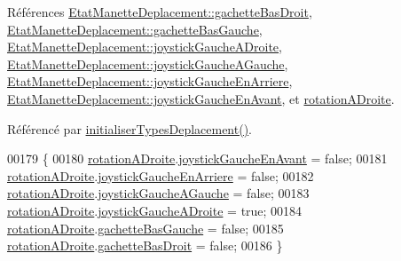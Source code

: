Références \hyperlink{manette_8h_source_l00185}{Etat\+Manette\+Deplacement\+::gachette\+Bas\+Droit}, \hyperlink{manette_8h_source_l00184}{Etat\+Manette\+Deplacement\+::gachette\+Bas\+Gauche}, \hyperlink{manette_8h_source_l00183}{Etat\+Manette\+Deplacement\+::joystick\+Gauche\+A\+Droite}, \hyperlink{manette_8h_source_l00182}{Etat\+Manette\+Deplacement\+::joystick\+Gauche\+A\+Gauche}, \hyperlink{manette_8h_source_l00181}{Etat\+Manette\+Deplacement\+::joystick\+Gauche\+En\+Arriere}, \hyperlink{manette_8h_source_l00180}{Etat\+Manette\+Deplacement\+::joystick\+Gauche\+En\+Avant}, et \hyperlink{manette_8h_source_l00230}{rotation\+A\+Droite}.



Référencé par \hyperlink{manette_8cpp_source_l00085}{initialiser\+Types\+Deplacement()}.


\begin{DoxyCode}
00179 \{
00180     \hyperlink{class_manette_abeff301c65d7faeb68e7d38b8f0b5122}{rotationADroite}.\hyperlink{struct_etat_manette_deplacement_a8c8e3ca694408bc6a6ced4e20b9da0be}{joystickGaucheEnAvant} = \textcolor{keyword}{false};
00181     \hyperlink{class_manette_abeff301c65d7faeb68e7d38b8f0b5122}{rotationADroite}.\hyperlink{struct_etat_manette_deplacement_a584cf1538425c87588c5b96b79c8d482}{joystickGaucheEnArriere} = \textcolor{keyword}{false};
00182     \hyperlink{class_manette_abeff301c65d7faeb68e7d38b8f0b5122}{rotationADroite}.\hyperlink{struct_etat_manette_deplacement_af7e92a8d8f116e2bc4a5a95386f604e7}{joystickGaucheAGauche} = \textcolor{keyword}{false};
00183     \hyperlink{class_manette_abeff301c65d7faeb68e7d38b8f0b5122}{rotationADroite}.\hyperlink{struct_etat_manette_deplacement_a8fa93da5af430ac00ffd4ee8b76987a2}{joystickGaucheADroite} = \textcolor{keyword}{true};
00184     \hyperlink{class_manette_abeff301c65d7faeb68e7d38b8f0b5122}{rotationADroite}.\hyperlink{struct_etat_manette_deplacement_a0d197e25bc2e0402a068a8d012c25472}{gachetteBasGauche} = \textcolor{keyword}{false};
00185     \hyperlink{class_manette_abeff301c65d7faeb68e7d38b8f0b5122}{rotationADroite}.\hyperlink{struct_etat_manette_deplacement_a4588620c1e2a3543ce67c9a791aac106}{gachetteBasDroit} = \textcolor{keyword}{false};
00186 \}
\end{DoxyCode}
\mbox{\label{class_manette_a9c1348e7b4c4cc071c9b8bac79f0eeab}} 
